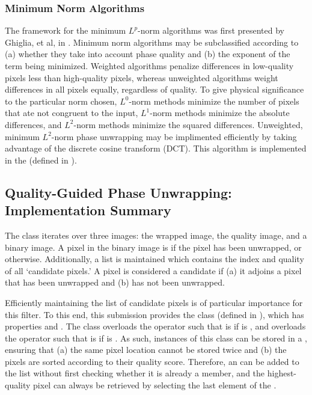 \subsubsection{Minimum Norm Algorithms}

The framework for the minimum $L^p$-norm algorithms was first presented by Ghiglia, et al, in \cite{Ghiglia1998}. Minimum norm algorithms may be subclassified according to (a) whether they take into account phase quality and (b) the exponent of the term being minimized.  Weighted algorithms penalize differences in low-quality pixels less than high-quality pixels, whereas unweighted algorithms weight differences in all pixels equally, regardless of quality.  To give physical significance to the particular norm chosen, $L^0$-norm methods minimize the number of pixels that ate not congruent to the input, $L^1$-norm methods minimize the absolute differences, and $L^2$-norm methods minimize the squared differences.  Unweighted, minimum $L^2$-norm phase unwrapping may be implimented efficiently by taking advantage of the discrete cosine transform (DCT).  This algorithm is implemented in the  (defined in ).

\subsection{Quality-Guided Phase Unwrapping: Implementation Summary}

The  class iterates over three images: the wrapped image, the quality image, and a binary image.  A pixel in the binary image is  if the pixel has been unwrapped, or  otherwise.  Additionally, a list is maintained which contains the index and quality of all `candidate pixels.'  A pixel is considered a candidate if (a) it adjoins a pixel that has been unwrapped and (b) has not been unwrapped.

Efficiently maintaining the list of candidate pixels is of particular importance for this filter.  To this end, this submission provides the  class (defined in ), which has properties  and .  The class overloads the \code{==} operator such that  is  if  is , and overloads the \code{>} operator such that  is  if  is .  As such, instances of this class can be stored in a , ensuring that (a) the same pixel location cannot be stored twice and (b) the pixels are sorted according to their quality score.  Therefore, an  can be added to the list without first checking whether it is already a member, and the highest-quality pixel can always be retrieved by selecting the last element of the .

